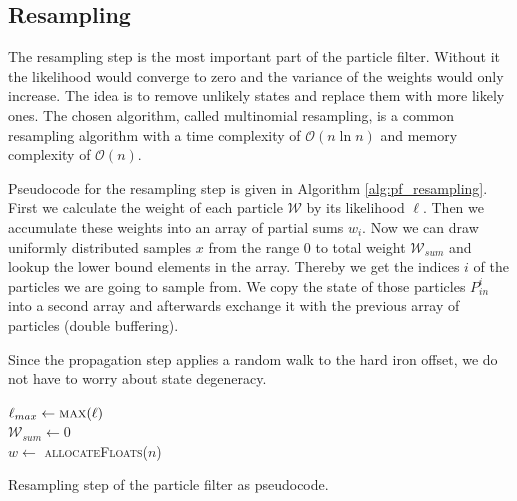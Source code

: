 \subsection{Resampling}

The resampling step is the most important part of the particle filter. Without it the likelihood would converge to zero and the variance of the weights would only increase. The idea is to remove unlikely states and replace them with more likely ones. The chosen algorithm, called multinomial resampling\cite{Doucet2011}\cite{parallel_resampling}, is a common resampling algorithm with a time complexity of $\mathcal{O}(n \ln{n})$ and memory complexity of $\mathcal{O}(n)$.\cite{particle_resample}

Pseudocode for the resampling step is given in Algorithm \ref{alg:pf_resampling}. First we calculate the weight of each particle $\mathcal{W}$ by its likelihood $\ell$. Then we accumulate these weights into an array of partial sums $w_i$. Now we can draw uniformly distributed samples $x$ from the range $0$ to total weight $\mathcal{W}_{sum}$ and lookup the lower bound elements in the array. Thereby we get the indices $i$ of the particles we are going to sample from. We copy the state of those particles $P_{in}^{i}$ into a second array and afterwards exchange it with the previous array of particles (double buffering).

Since the propagation step applies a random walk to the hard iron offset, we do not have to worry about state degeneracy.

\begin{algorithm}[h]
	$\ell_{max} \leftarrow \textsc{max}(\ell)$\\
	$\mathcal{W}_{sum} \leftarrow 0$\\
	$w \leftarrow$ \textsc{allocateFloats}($n$)\\
	\caption{Resampling step of the particle filter as pseudocode.}
	\label{alg:pf_resampling}
\end{algorithm}

